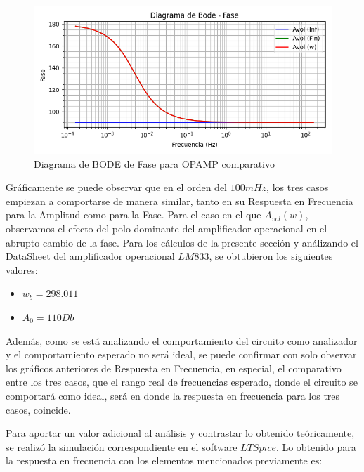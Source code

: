 \begin{figure}[H]
    \centering 
    \includegraphics [scale=1] {../Ejercicio3-CircuitoIntegradoresyDerivadores/Imagenes/comparativo-fase.png} 
    \caption{Diagrama de BODE de Fase para OPAMP comparativo }
    \label{fig:emptyPlotTool}
\end{figure}

Gráficamente se puede observar que en el orden del $100 mHz$, los tres casos empiezan a comportarse de manera similar, tanto en su Respuesta en Frecuencia para la Amplitud
como para la Fase. Para el caso en el que $A_{vol}(w)$, observamos el efecto del polo dominante del amplificador operacional en el abrupto cambio de la fase. Para los cálculos de la presente sección y análizando
el DataSheet del amplificador operacional $LM833$, se obtubieron los siguientes valores:

\begin{itemize}
	\item $w_b = 298.011$
	\item $A_0 = 110 Db$
\end{itemize}

Además, como se está analizando el comportamiento del circuito como analizador y el comportamiento esperado no será ideal, se puede confirmar con solo observar los gráficos anteriores de 
Respuesta en Frecuencia, en especial, el comparativo entre los tres casos, que el rango real de frecuencias esperado, donde el circuito se comportará como ideal, será en donde la respuesta en frecuencia
para los tres casos, coincide.

Para aportar un valor adicional al análisis y contrastar lo obtenido teóricamente, se realizó la simulación correspondiente en el software $LTSpice$. Lo obtenido para la respuesta en frecuencia con los elementos
mencionados previamente es:

